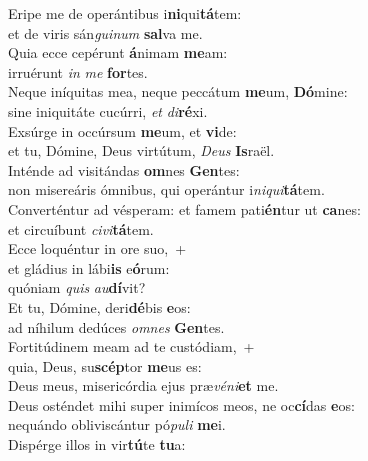 \evenverse Eripe me de operántibus i\textbf{ni}qui\textbf{tá}tem:~\*\\
\evenverse et de viris sán\textit{gui}\textit{num} \textbf{sal}va me.\\
\oddverse Quia ecce cepérunt \textbf{á}nimam \textbf{me}am:~\*\\
\oddverse irruérunt \textit{in} \textit{me} \textbf{for}tes.\\
\evenverse Neque iníquitas mea, neque peccátum \textbf{me}um, \textbf{Dó}mine:~\*\\
\evenverse sine iniquitáte cucúrri, \textit{et} \textit{di}\textbf{ré}xi.\\
\oddverse Exsúrge in occúrsum \textbf{me}um, et \textbf{vi}de:~\*\\
\oddverse et tu, Dómine, Deus virtútum, \textit{De}\textit{us} \textbf{Is}raël.\\
\evenverse Inténde ad visitándas \textbf{om}nes \textbf{Gen}tes:~\*\\
\evenverse non misereáris ómnibus, qui operántur i\textit{ni}\textit{qui}\textbf{tá}tem.\\
\oddverse Converténtur ad vésperam: et famem pati\textbf{én}tur ut \textbf{ca}nes:~\*\\
\oddverse et circuíbunt \textit{ci}\textit{vi}\textbf{tá}tem.\\
\evenverse Ecce loquéntur in ore suo,~+\\
\evenverse  et gládius in lábi\textbf{is} e\textbf{ó}rum:~\*\\
\evenverse quóniam \textit{quis} \textit{au}\textbf{dí}vit?\\
\oddverse Et tu, Dómine, deri\textbf{dé}bis \textbf{e}os:~\*\\
\oddverse ad níhilum dedúces \textit{om}\textit{nes} \textbf{Gen}tes.\\
\evenverse Fortitúdinem meam ad te custódiam,~+\\
\evenverse  quia, Deus, su\textbf{scép}tor \textbf{me}us es:~\*\\
\evenverse Deus meus, misericórdia ejus præ\textit{vé}\textit{ni}\textbf{et} me.\\
\oddverse Deus osténdet mihi super inimícos meos, ne oc\textbf{cí}das \textbf{e}os:~\*\\
\oddverse nequándo obliviscántur pó\textit{pu}\textit{li} \textbf{me}i.\\
\evenverse Dispérge illos in vir\textbf{tú}te \textbf{tu}a:~\*\\
